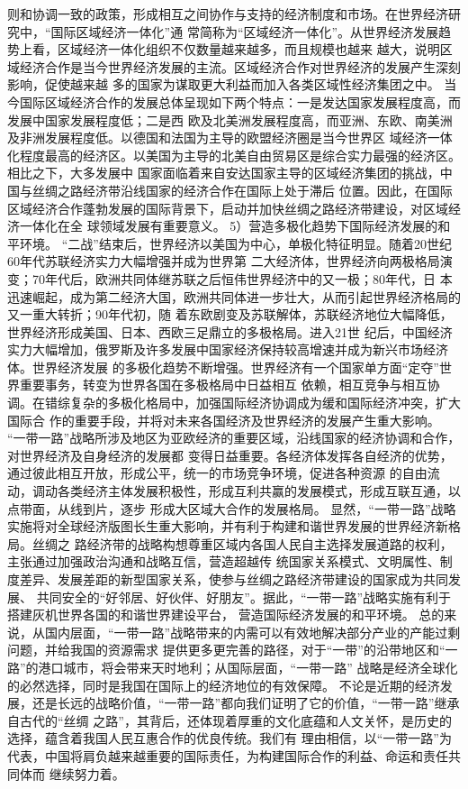 \documentclass[a4paper]{cctart}
\numberwithin{equation}{section} \pagestyle{fancy}
\begin{document}
则和协调一致的政策，形成相互之间协作与支持的经济制度和市场。在世界经济研究中，“国际区域经济一体化”通
常简称为“区域经济一体化”。从世界经济发展趋势上看，区域经济一体化组织不仅数量越来越多，而且规模也越来
越大，说明区域经济合作是当今世界经济发展的主流。区域经济合作对世界经济的发展产生深刻影响，促使越来越
多的国家为谋取更大利益而加入各类区域性经济集团之中。
当今国际区域经济合作的发展总体呈现如下两个特点：一是发达国家发展程度高，而发展中国家发展程度低；二是西
欧及北美洲发展程度高，而亚洲、东欧、南美洲及非洲发展程度低。以德国和法国为主导的欧盟经济圈是当今世界区
域经济一体化程度最高的经济区。以美国为主导的北美自由贸易区是综合实力最强的经济区。相比之下，大多发展中
国家面临着来自安达国家主导的区域经济集团的挑战，中国与丝绸之路经济带沿线国家的经济合作在国际上处于滞后
位置。因此，在国际区域经济合作蓬勃发展的国际背景下，启动并加快丝绸之路经济带建设，对区域经济一体化在全
球领域发展有重要意义。
5）营造多极化趋势下国际经济发展的和平环境。
“二战”结束后，世界经济以美国为中心，单极化特征明显。随着20世纪60年代苏联经济实力大幅增强并成为世界第
二大经济体，世界经济向两极格局演变；70年代后，欧洲共同体继苏联之后恒伟世界经济中的又一极；80年代，日
本迅速崛起，成为第二经济大国，欧洲共同体进一步壮大，从而引起世界经济格局的又一重大转折；90年代初，随
着东欧剧变及苏联解体，苏联经济地位大幅降低，世界经济形成美国、日本、西欧三足鼎立的多极格局。进入21世
纪后，中国经济实力大幅增加，俄罗斯及许多发展中国家经济保持较高增速并成为新兴市场经济体。世界经济发展
的多极化趋势不断增强。世界经济有一个国家单方面“定夺”世界重要事务，转变为世界各国在多极格局中日益相互
依赖，相互竞争与相互协调。在错综复杂的多极化格局中，加强国际经济协调成为缓和国际经济冲突，扩大国际合
作的重要手段，并将对未来各国经济及世界经济的发展产生重大影响。
“一带一路”战略所涉及地区为亚欧经济的重要区域，沿线国家的经济协调和合作，对世界经济及自身经济的发展都
变得日益重要。各经济体发挥各自经济的优势，通过彼此相互开放，形成公平，统一的市场竞争环境，促进各种资源
的自由流动，调动各类经济主体发展积极性，形成互利共赢的发展模式，形成互联互通，以点带面，从线到片，逐步
形成大区域大合作的发展格局。
显然，“一带一路”战略实施将对全球经济版图长生重大影响，并有利于构建和谐世界发展的世界经济新格局。丝绸之
路经济带的战略构想尊重区域内各国人民自主选择发展道路的权利，主张通过加强政治沟通和战略互信，营造超越传
统国家关系模式、文明属性、制度差异、发展差距的新型国家关系，使参与丝绸之路经济带建设的国家成为共同发展、
共同安全的“好邻居、好伙伴、好朋友”。据此，“一带一路”战略实施有利于搭建灰机世界各国的和谐世界建设平台，
营造国际经济发展的和平环境。
总的来说，从国内层面，“一带一路”战略带来的内需可以有效地解决部分产业的产能过剩问题，并给我国的资源需求
提供更多更完善的路径，对于“一带”的沿带地区和“一路”的港口城市，将会带来天时地利；从国际层面，“一带一路”
战略是经济全球化的必然选择，同时是我国在国际上的经济地位的有效保障。
不论是近期的经济发展，还是长远的战略价值，“一带一路”都向我们证明了它的价值，“一带一路”继承自古代的“丝绸
之路”，其背后，还体现着厚重的文化底蕴和人文关怀，是历史的选择，蕴含着我国人民互惠合作的优良传统。我们有
理由相信，以“一带一路”为代表，中国将肩负越来越重要的国际责任，为构建国际合作的利益、命运和责任共同体而
继续努力着。
\end{document}
